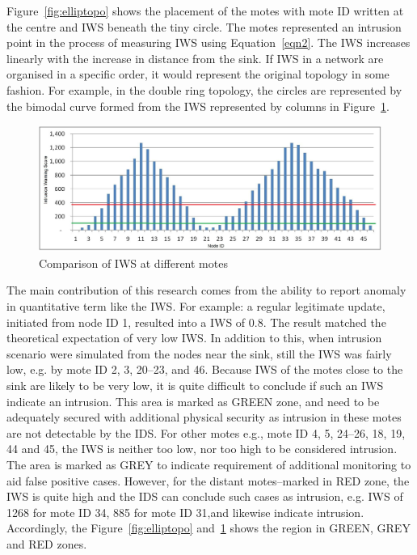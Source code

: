 \documentclass[conference]{IEEEtran}
\begin{document}
Figure~\ref{fig:elliptopo} shows the placement of the motes with mote ID written at the centre and IWS beneath the tiny circle.
The motes represented an intrusion point in the process of measuring IWS using Equation~\ref{eqn2}.
The IWS increases linearly with the increase in distance from the sink.
If IWS in a network are organised in a specific order, it would represent the original topology in some fashion.
For example, in the double ring topology, the circles are represented by the bimodal curve formed from the IWS represented by columns in Figure~\ref{fig:ellipgraph}.
\begin{figure}[tbph!]
	\centering
        \includegraphics[width=\linewidth]{DR_Column}
        \caption{Comparison of IWS at different motes}
        \label{fig:ellipgraph}
\end{figure}

The main contribution of this research comes from the ability to report anomaly in quantitative term like the IWS.
For example:  a regular legitimate update, initiated from node ID 1, resulted into a IWS of 0.8.
The result matched the theoretical expectation of very low IWS.
In addition to this, when intrusion scenario were simulated from the nodes near the sink, still the IWS was fairly low, e.g. by mote ID 2, 3, 20--23, and 46. 
Because IWS of the motes close to the sink are likely to be very low, it is quite difficult to conclude if such an IWS indicate an intrusion.
This area is marked as GREEN zone, and need to be adequately secured with additional physical security as intrusion in these motes are not detectable by the IDS.
For other motes e.g., mote ID 4, 5, 24--26, 18, 19, 44 and 45, the IWS is neither too low, nor too high to be considered intrusion. The area is marked as GREY to indicate requirement of additional monitoring to aid false positive cases.
However, for the distant motes--marked in RED zone, the IWS is quite high and the IDS can conclude such cases as intrusion, e.g. IWS of 1268 for mote ID 34, 885 for mote ID 31,and likewise indicate intrusion.
Accordingly, the Figure~\ref{fig:elliptopo} and~\ref{fig:ellipgraph} shows the region in GREEN, GREY and RED zones.%
\end{document}
